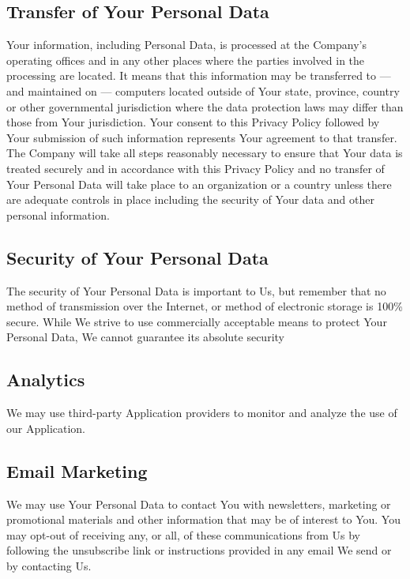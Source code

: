 \documentclass{article}
\begin{document}
\subsection*{Transfer of Your Personal Data}
Your information, including Personal Data, is processed at the Company's operating offices and in any other places where the parties involved in the processing are located. It means that this information may be transferred to — and maintained on — computers located outside of Your state, province, country or other governmental jurisdiction where the data protection laws may differ than those from Your jurisdiction.\newline
Your consent to this Privacy Policy followed by Your submission of such information represents Your agreement to that transfer.\newline
The Company will take all steps reasonably necessary to ensure that Your data is treated securely and in accordance with this Privacy Policy and no transfer of Your Personal Data will take place to an organization or a country unless there are adequate controls in place including the security of Your data and other personal information.\newline
\subsection*{Security of Your Personal Data}
The security of Your Personal Data is important to Us, but remember that no method of transmission over the Internet, or method of electronic storage is 100\% secure. While We strive to use commercially acceptable means to protect Your Personal Data, We cannot guarantee its absolute security\newline
\subsection*{Analytics}
We may use third-party Application providers to monitor and analyze the use of our Application.\newline
\subsection*{Email Marketing}
We may use Your Personal Data to contact You with newsletters, marketing or promotional materials and other information that may be of interest to You. You may opt-out of receiving any, or all, of these communications from Us by following the unsubscribe link or instructions provided in any email We send or by contacting Us.\newline
\end{document}
